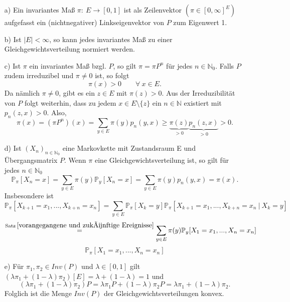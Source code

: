 \label{Auflistende Bemerkung zu invarianten Maßen}
\mbox{}
\begin{itemize}
\item[a)] Ein invariantes Maß $\pi : \: E \to [0,1]$ ist als Zeilenvektor $(\pi \in [0,\infty]^{E})$ aufgefasst ein (nichtnegativer) Linkseigenvektor von $P$ zum Eigenwert 1.
\item[b)] Ist $\vert E \vert < \infty$, so kann jedes invariantes Maß zu einer Gleichgewichtsverteilung normiert werden.
\item[c)] Ist $\pi$ ein invariantes Maß bzgl. $P$, so gilt $\pi = \pi P^{n}$ für jedes $n \in \mathbb{N}_{0}$. Falls $P$ zudem irreduzibel und $\pi \neq 0$ ist, so folgt
\begin{equation*}
\pi(x) > 0 \qquad \forall \: x \in E.
\end{equation*}
Da nämlich $\pi \neq 0$, gibt es ein $z \in E$ mit $\pi (z) > 0$. Aus der Irreduzibilität von $P$ folgt weiterhin, dass zu jedem $x \in E \setminus \lbrace z \rbrace$ ein $n \in \mathbb{N}$ existiert mit $p_{n}(z,x)>0$. Also,
\begin{equation*}
\pi (x) = (\pi P^{n})(x) = \sum_{y \in E} \pi (y) p_{n} (y,x) \geq
\underbrace{\pi (z)}_{>0} \underbrace{ p_{n} (z,x)}_{>0} > 0.
\end{equation*} 
\item[d)] Ist $(X_{n})_{n \in \mathbb{N}_{0}}$ eine Markovkette mit Zustandsraum E und Übergangsmatrix $P$. Wenn $\pi$ eine Gleichgewichtsverteilung ist, so gilt für jedes $n \in \mathbb{N}_{0}$
\begin{equation*}
\mathbb{P}_{\pi}[X_{n} = x] = \sum_{y \in E} \pi (y) \mathbb{P}_{y}[X_{n} = x] = \sum_{y \in E} \pi (y) p_{n}(y,x) = \pi (x).  
\end{equation*}
Insbesondere ist
\begin{equation*}
\mathbb{P}_{\pi} [X_{k+1} = x_{1},...,X_{k+n} = x_{n}] = \sum_{y \in E} \mathbb{P}_{\pi} [X_{k} = y] \mathbb{P}_{\pi} [X_{k+1} = x_{1},...,X_{k+n} = x_{n} \: | \: X_{k} = y]
\end{equation*}
\begin{equation*}
\stackrel{\mathrm{Satz} \: \ref{vorangegangene und zukünftige Ereignisse}}{=} \sum_{y \in E} \pi (y)  \mathbb{P}_{y} [X_{1} = x_{1},...,X_{n} = x_{n}]
\end{equation*}
\begin{equation*}
\mathbb{P}_{\pi} [X_{1} = x_{1},...,X_{n} = x_{n}]
\end{equation*}
\item[e)] Für $\pi_{1}, \pi_{2} \in Inv(P)$ und $\lambda \in [0,1]$ gilt $(\lambda \pi_{1} + (1- \lambda) \pi_{2})[E] = \lambda + (1-\lambda)=1$ und
\begin{equation*}
(\lambda \pi_{1} + (1- \lambda) \pi_{2})P = \lambda \pi_{1}P + (1- \lambda) \pi_{2}P = \lambda \pi_{1} + (1- \lambda) \pi_{2}.
\end{equation*}
Folglich ist die Menge $Inv(P)$ der Gleichgewichtsverteilungen konvex.
\end{itemize}


